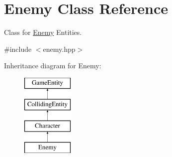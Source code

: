 \hypertarget{class_enemy}{}\section{Enemy Class Reference}
\label{class_enemy}


Class for \mbox{\hyperlink{class_enemy}{Enemy}} Entities.  




{\ttfamily \#include $<$enemy.\+hpp$>$}

Inheritance diagram for Enemy\+:\begin{figure}[H]
\begin{center}
\leavevmode
\includegraphics[height=4.000000cm]{class_enemy}
\end{center}
\end{figure}
